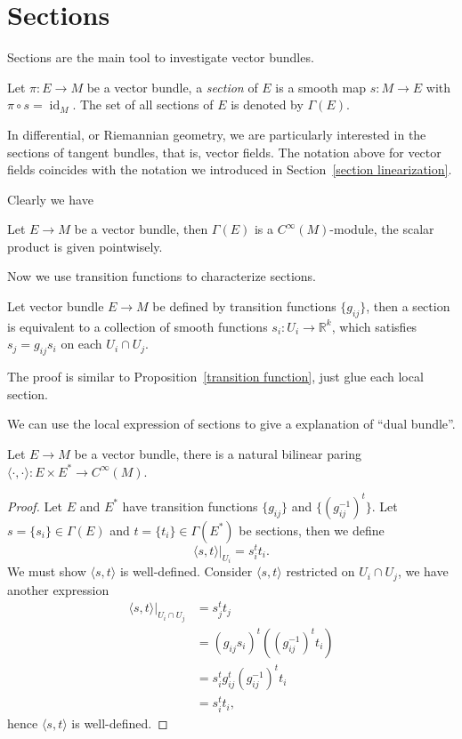 \section{Sections}

Sections are the main tool to investigate vector bundles.

\begin{defn}
    Let $\pi:E\to M$ be a vector bundle, a \emph{section} of $E$ is a smooth map $s:M\to E$ with $\pi\circ s=\operatorname{id}_M$.
    The set of all sections of $E$ is denoted by $\Gamma(E)$.
\end{defn}

\begin{rem}
    In differential, or Riemannian geometry, we are particularly interested in the sections of tangent bundles, that is, vector fields.
    The notation above for vector fields coincides with the notation we introduced in Section~\ref{section linearization}.
\end{rem}

Clearly we have
\begin{prop}
    Let $E\to M$ be a vector bundle, then $\Gamma(E)$ is a $C^\infty(M)$-module, the scalar product is given pointwisely.
\end{prop}

Now we use transition functions to characterize sections.
\begin{prop}
    Let vector bundle $E\to M$ be defined by transition functions $\{g_{ij}\}$, then a section is equivalent to a collection of smooth functions $s_i:U_i\to\mathbb{R}^k$, which satisfies $s_j=g_{ij}s_i$ on each $U_i\cap U_j$.
\end{prop}
The proof is similar to Proposition~\ref{transition function}, just glue each local section.

We can use the local expression of sections to give a explanation of ``dual bundle''.
\begin{prop}
    Let $E\to M$ be a vector bundle, there is a natural bilinear paring $\langle\cdot,\cdot\rangle:E\times E^*\to C^\infty(M)$.
\end{prop}
\begin{proof}
    Let $E$ and $E^*$ have transition functions $\{g_{ij}\}$ and $\{(g_{ij}^{-1})^t\}$.
    Let $s=\{s_i\}\in\Gamma(E)$ and $t=\{t_i\}\in\Gamma(E^*)$ be sections, then we define
    \[\langle s,t\rangle|_{U_i}=s_i^tt_i.\]
    We must show $\langle s,t\rangle$ is well-defined.
    Consider $\langle s,t\rangle$ restricted on $U_i\cap U_j$, we have another expression
    \begin{align*}
        \langle s,t\rangle|_{U_i\cap U_j}&=s_j^tt_j\\
        &=(g_{ij}s_i)^t((g_{ij}^{-1})^tt_i)\\
        &=s_i^tg_{ij}^t(g_{ij}^{-1})^tt_i\\
        &=s_i^tt_i,
    \end{align*}
    hence $\langle s,t\rangle$ is well-defined.
\end{proof}

